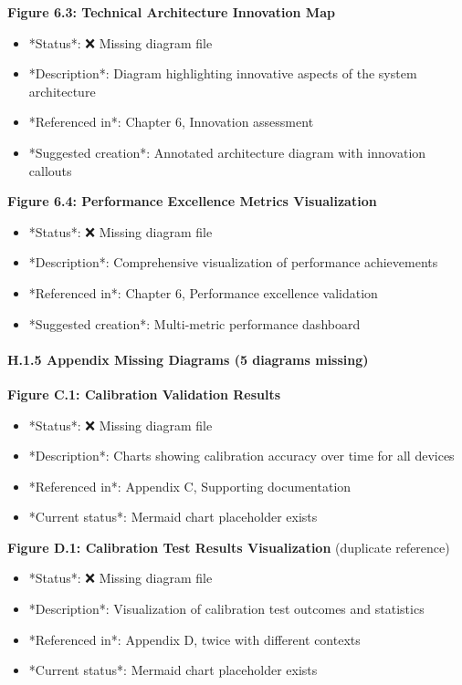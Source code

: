 \documentclass[12pt,a4paper]{article}
\begin{document}
{{\begin{itemize}
\end{itemize}
\textbf{Figure 6.3: Technical Architecture Innovation Map}

\begin{itemize}
\item *Status*: ❌ Missing diagram file
\item *Description*: Diagram highlighting innovative aspects of the system architecture
\item *Referenced in*: Chapter 6, Innovation assessment
\item *Suggested creation*: Annotated architecture diagram with innovation callouts

\end{itemize}
\textbf{Figure 6.4: Performance Excellence Metrics Visualization}

\begin{itemize}
\item *Status*: ❌ Missing diagram file
\item *Description*: Comprehensive visualization of performance achievements
\item *Referenced in*: Chapter 6, Performance excellence validation
\item *Suggested creation*: Multi-metric performance dashboard

\end{itemize}
\paragraph{H.1.5 Appendix Missing Diagrams (5 diagrams missing)}

\textbf{Figure C.1: Calibration Validation Results}

\begin{itemize}
\item *Status*: ❌ Missing diagram file
\item *Description*: Charts showing calibration accuracy over time for all devices
\item *Referenced in*: Appendix C, Supporting documentation
\item *Current status*: Mermaid chart placeholder exists

\end{itemize}
\textbf{Figure D.1: Calibration Test Results Visualization} (duplicate reference)

\begin{itemize}
\item *Status*: ❌ Missing diagram file
\item *Description*: Visualization of calibration test outcomes and statistics
\item *Referenced in*: Appendix D, twice with different contexts
\item *Current status*: Mermaid chart placeholder exists


\end{itemize}}}
\end{document}
